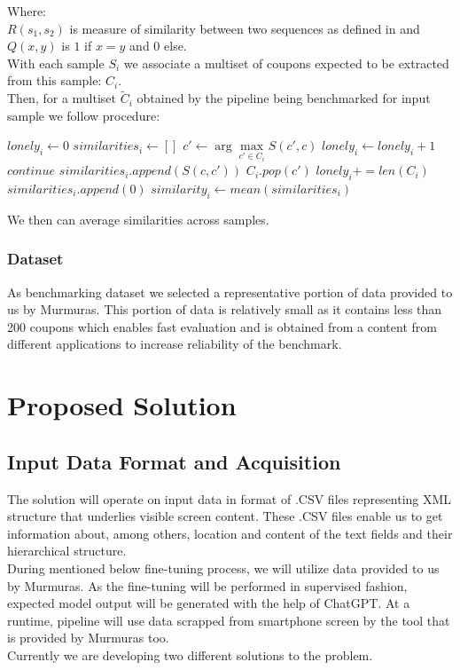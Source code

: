 \documentclass[12pt]{article}
\begin{document}
Where:\\
$R(s_1,s_2)$ is measure of similarity between two sequences as defined in \cite{python-seq-match} and $Q(x, y)$ is $1$ if $x=y$ and $0$ else.\\
With each sample $S_i$ we associate a multiset of coupons expected to be extracted from this sample: $C_i$.\\
Then, for a multiset $\tilde{C}_i$ obtained by the pipeline being benchmarked for input sample we follow procedure:
\begin{algorithmic}
\State $lonely_i \gets 0$
\State $similarities_i \gets []$
    \State $c' \gets \arg\max\limits_{c' \in C_i} S(c',c)$
        \State $lonely_i \gets lonely_i + 1$
        \State $continue$
    \EndIf
    \State $similarities_i.append(S(c,c'))$
    \State $C_i.pop(c')$
\EndFor
\State $lonely_i += len(C_i)$
    \State $similarities_i.append(0)$
\EndFor
\State $similarity_i \gets mean(similarities_i)$
\end{algorithmic}
We then can average similarities across samples.
\subsubsection*{Dataset}
As benchmarking dataset we selected a representative portion of data provided to us by Murmuras. This portion of data is relatively small as it contains less than 200 coupons which enables fast evaluation and is obtained from a content from different applications to increase reliability of the benchmark.
\section*{Proposed Solution}
\subsection*{Input Data Format and Acquisition}
The solution will operate on input data in format of .CSV files representing XML structure that underlies visible screen content. These .CSV files enable us to get information about, among others, location and content of the text fields and their hierarchical structure. \\ During mentioned below fine-tuning process, we will utilize data provided to us by Murmuras. As the fine-tuning will be performed in supervised fashion, expected model output will be generated with the help of ChatGPT. At a runtime, pipeline will use data scrapped from smartphone screen by the tool that is provided by Murmuras too.\\
Currently we are developing two different solutions to the problem.
\end{document}
